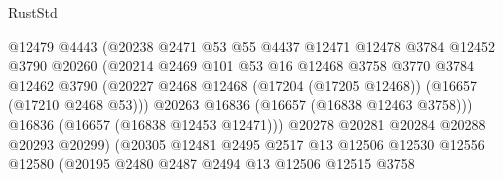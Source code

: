 \begin{lexlean}{RustStd}
\begin{coremodule}
                                    @12479
                                    @4443
                                    (@20238
                                      @2471
                                      @53
                                      @55
                                      @4437
                                      @12471
                                      @12478
                                      @3784
                                      @12452
                                      @3790
                                      @20260
                                      (@20214
                                        @2469
                                        @101
                                        @53
                                        @16
                                        @12468
                                        @3758
                                        @3770
                                        @3784
                                        @12462
                                        @3790
                                        (@20227
                                          @2468
                                          @12468
                                          (@17204 (@17205 @12468))
                                          (@16657 (@17210 @2468 @53)))
                                        @20263
                                        @16836
                                        (@16657 (@16838 @12463 @3758)))
                                      @16836
                                      (@16657 (@16838 @12453 @12471)))
                                    @20278
                                    @20281
                                    @20284
                                    @20288
                                    @20293
                                    @20299)
                                  (@20305
                                    @12481
                                    @2495
                                    @2517
                                    @13
                                    @12506
                                    @12530
                                    @12556
                                    @12580
                                    (@20195
                                      @2480
                                      @2487
                                      @2494
                                      @13
                                      @12506
                                      @12515
                                      @3758

\end{coremodule}
\end{lexlean}
